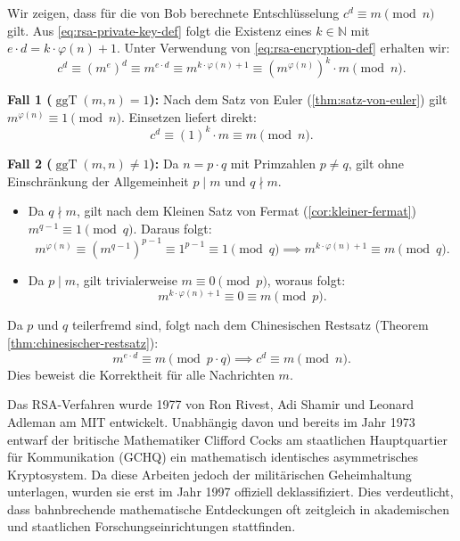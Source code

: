 \begin{math-stroke}
\begin{short-proof}
Wir zeigen, dass für die von Bob berechnete Entschlüsselung $c^d \equiv m \pmod n$ gilt.
Aus \eqref{eq:rsa-private-key-def} folgt die Existenz eines $k \in \mathbb{N}$ mit $e \cdot d = k \cdot \varphi(n) + 1$. Unter Verwendung von \eqref{eq:rsa-encryption-def} erhalten wir:
\[
c^d \equiv (m^e)^d \equiv m^{e \cdot d} \equiv m^{k \cdot \varphi(n) + 1} \equiv (m^{\varphi(n)})^k \cdot m \pmod n.
\]
\par\vspace{1ex}\noindent
\textbf{Fall 1 ($\operatorname{ggT}(m, n) = 1$):}
Nach dem Satz von Euler (\cref{thm:satz-von-euler}) gilt $m^{\varphi(n)} \equiv 1 \pmod n$. Einsetzen liefert direkt:
\[
c^d \equiv (1)^k \cdot m \equiv m \pmod n.
\]
\par\vspace{1ex}\noindent
\textbf{Fall 2 ($\operatorname{ggT}(m, n) \neq 1$):}
Da $n = p \cdot q$ mit Primzahlen $p \neq q$, gilt ohne Einschränkung der Allgemeinheit $p \mid m$ und $q \nmid m$.
\begin{itemize}
    \item Da $q \nmid m$, gilt nach dem Kleinen Satz von Fermat (\cref{cor:kleiner-fermat}) $m^{q-1} \equiv 1 \pmod q$. Daraus folgt:
    \[
    m^{\varphi(n)} \equiv (m^{q-1})^{p-1} \equiv 1^{p-1} \equiv 1 \pmod q \implies m^{k \cdot \varphi(n) + 1} \equiv m \pmod q.
    \]
    \item Da $p \mid m$, gilt trivialerweise $m \equiv 0 \pmod p$, woraus folgt:
    \[
    m^{k \cdot \varphi(n) + 1} \equiv 0 \equiv m \pmod p.
    \]
\end{itemize}
Da $p$ und $q$ teilerfremd sind, folgt nach dem Chinesischen Restsatz (Theorem \ref{thm:chinesischer-restsatz}):
\[
m^{e \cdot d} \equiv m \pmod{p \cdot q} \implies c^d \equiv m \pmod n.
\]
Dies beweist die Korrektheit für alle Nachrichten $m$.
\end{short-proof}
\end{math-stroke}

\begin{didactic-insight}
Das RSA-Verfahren wurde 1977 von Ron Rivest, Adi Shamir und Leonard Adleman am MIT entwickelt. Unabhängig davon und bereits im Jahr 1973 entwarf der britische Mathematiker Clifford Cocks am staatlichen Hauptquartier für Kommunikation (GCHQ) ein mathematisch identisches asymmetrisches Kryptosystem. Da diese Arbeiten jedoch der militärischen Geheimhaltung unterlagen, wurden sie erst im Jahr 1997 offiziell deklassifiziert. Dies verdeutlicht, dass bahnbrechende mathematische Entdeckungen oft zeitgleich in akademischen und staatlichen Forschungseinrichtungen stattfinden.
\end{didactic-insight}

